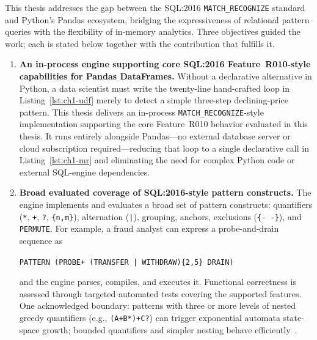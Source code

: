This thesis addresses the gap between the SQL:2016
\texttt{MATCH\_RECOGNIZE} standard and Python's Pandas ecosystem,
bridging the expressiveness of relational pattern queries with the
flexibility of in-memory analytics.  Three objectives guided the
work; each is stated below together with the contribution that
fulfills it.

\begin{enumerate}

  \item \textbf{An in-process engine supporting core SQL:2016
    Feature~R010-style capabilities for Pandas DataFrames.}
    Without a declarative alternative in Python, a data scientist
    must write the twenty-line hand-crafted loop in
    Listing~\ref{lst:ch1-udf} merely to detect a simple
    three-step declining-price pattern.  This thesis delivers
    an in-process \texttt{MATCH\_RECOGNIZE}-style implementation
    supporting the core Feature~R010 behavior evaluated in this
    thesis.  It runs entirely alongside Pandas---no external
    database server or cloud subscription required---reducing that
    loop to a single declarative call in Listing~\ref{lst:ch1-mr}
    and eliminating the need for complex Python code or external
    SQL-engine dependencies.

  \item \textbf{Broad evaluated coverage of SQL:2016-style pattern
    constructs.}
    The engine implements and evaluates a broad set of pattern
    constructs: quantifiers (\texttt{*}, \texttt{+}, \texttt{?},
    \texttt{\{n,m\}}), alternation (\texttt{|}), grouping,
    anchors, exclusions (\texttt{\{- -\}}), and \texttt{PERMUTE}.
    For example, a fraud analyst can express a probe-and-drain
    sequence as

    \medskip
    \texttt{PATTERN (PROBE+ (TRANSFER | WITHDRAW)\{2,5\} DRAIN)}
    \medskip

    \noindent
    and the engine parses, compiles, and executes it.  Functional
    correctness is assessed through targeted automated tests
    covering the supported features.  One acknowledged boundary:
    patterns with three or
    more levels of nested greedy quantifiers
    (e.g., \texttt{(A+B*)+C?}) can trigger exponential
    automata state-space growth; bounded quantifiers and simpler
    nesting behave efficiently~\cite{michels2018new}.


\end{enumerate}
